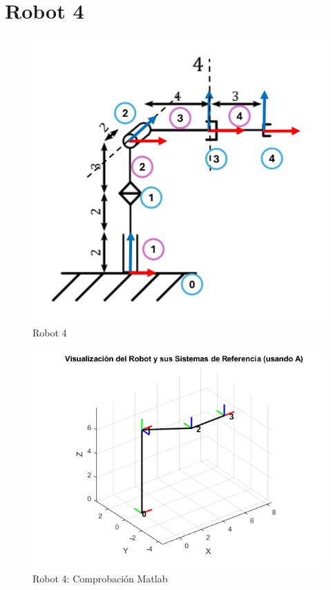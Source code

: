 \section{Robot 4}
\begin{figure}[h]
	\centering
	{%
	\includegraphics[width=0.7\linewidth]{img/Robot4_1}
	\caption{Robot 4}
	\label{fig:robot41}
	}
\end{figure}
\begin{figure}[h]
	\centering
	{%
	\includegraphics[width=0.7\linewidth]{img/Robot4}
	\caption{Robot 4: Comprobación Matlab}
	\label{fig:robot4}
	}
\end{figure}

